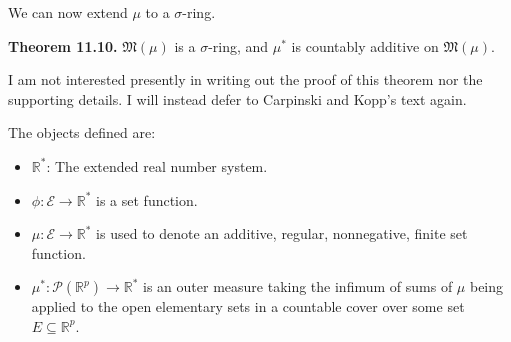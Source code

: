 \documentclass[a4paper]{article}
\newcommand{\R}{\mathbb{R}}
\begin{document}
We can now extend $\mu$ to a $\sigma$-ring.

\textbf{Theorem 11.10.} $\mathfrak{M}(\mu)$ is a $\sigma$-ring, and $\mu^*$ is countably additive on $\mathfrak{M}(\mu)$.

I am not interested presently in writing out the proof of this theorem nor the supporting details. I will instead defer to Carpinski and Kopp's text again.

The objects defined are:
\begin{itemize}
    \item $\R^*$: The extended real number system.
    \item $\phi : \mathscr{E} \to \R^*$ is a set function.
    \item $\mu : \mathscr{E} \to \R^*$ is used to denote an additive, regular, nonnegative, finite set function.
    \item $\mu^* : \mathcal{P}(\R^p) \to \R^*$ is an outer measure taking the infimum of sums of $\mu$ being applied to the open elementary sets in a countable cover over some set $E \subseteq \R^p$.
\end{itemize}
\end{document}

